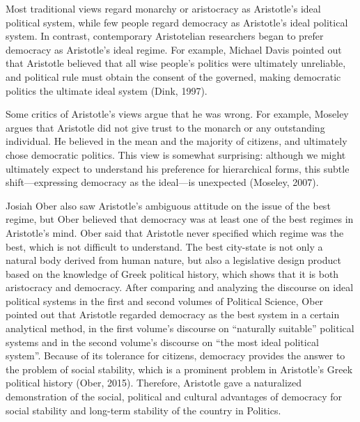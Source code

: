 \documentclass[11pt]{article}
\begin{document}
Most traditional views regard monarchy or aristocracy as Aristotle's ideal political system, while few people regard democracy as Aristotle's ideal political system. In contrast, contemporary Aristotelian researchers began to prefer democracy as Aristotle's ideal regime. For example, Michael Davis pointed out that Aristotle believed that all wise people's politics were ultimately unreliable, and political rule must obtain the consent of the governed, making democratic politics the ultimate ideal system (Dink, 1997).

Some critics of Aristotle’s views argue that he was wrong. For example, Moseley argues that Aristotle did not give trust to the monarch or any outstanding individual. He believed in the mean and the majority of citizens, and ultimately chose democratic politics. This view is somewhat surprising: although we might ultimately expect to understand his preference for hierarchical forms, this subtle shift—expressing democracy as the ideal—is unexpected (Moseley, 2007).

Josiah Ober also saw Aristotle's ambiguous attitude on the issue of the best regime, but Ober believed that democracy was at least one of the best regimes in Aristotle's mind. Ober said that Aristotle never specified which regime was the best, which is not difficult to understand. The best city-state is not only a natural body derived from human nature, but also a legislative design product based on the knowledge of Greek political history, which shows that it is both aristocracy and democracy. After comparing and analyzing the discourse on ideal political systems in the first and second volumes of Political Science, Ober pointed out that Aristotle regarded democracy as the best system in a certain analytical method, in the first volume's discourse on “naturally suitable” political systems and in the second volume's discourse on “the most ideal political system”. Because of its tolerance for citizens, democracy provides the answer to the problem of social stability, which is a prominent problem in Aristotle's Greek political history (Ober, 2015). Therefore, Aristotle gave a naturalized demonstration of the social, political and cultural advantages of democracy for social stability and long-term stability of the country in Politics.
\end{document}

